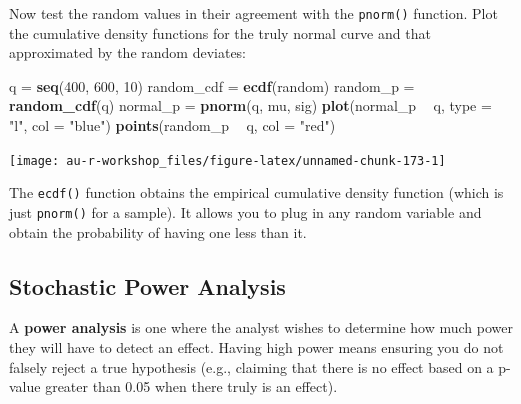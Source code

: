 \documentclass[]{book}
\newenvironment{Shaded}{\begin{snugshade}}{\end{snugshade}}
\newcommand{\KeywordTok}[1]{\textcolor[rgb]{0.13,0.29,0.53}{\textbf{#1}}}
\newcommand{\DataTypeTok}[1]{\textcolor[rgb]{0.13,0.29,0.53}{#1}}
\newcommand{\DecValTok}[1]{\textcolor[rgb]{0.00,0.00,0.81}{#1}}
\newcommand{\StringTok}[1]{\textcolor[rgb]{0.31,0.60,0.02}{#1}}
\newcommand{\OperatorTok}[1]{\textcolor[rgb]{0.81,0.36,0.00}{\textbf{#1}}}
\newcommand{\NormalTok}[1]{#1}
\theoremstyle{definition}
\theoremstyle{definition}
\theoremstyle{definition}
\theoremstyle{remark}
\begin{document}
Now test the random values in their agreement with the \texttt{pnorm()}
function. Plot the cumulative density functions for the truly normal
curve and that approximated by the random deviates:

\begin{Shaded}
\begin{Highlighting}[]
\NormalTok{q =}\StringTok{ }\KeywordTok{seq}\NormalTok{(}\DecValTok{400}\NormalTok{, }\DecValTok{600}\NormalTok{, }\DecValTok{10}\NormalTok{)}
\NormalTok{random_cdf =}\StringTok{ }\KeywordTok{ecdf}\NormalTok{(random)}
\NormalTok{random_p =}\StringTok{ }\KeywordTok{random_cdf}\NormalTok{(q)}
\NormalTok{normal_p =}\StringTok{ }\KeywordTok{pnorm}\NormalTok{(q, mu, sig)}
\KeywordTok{plot}\NormalTok{(normal_p }\OperatorTok{~}\StringTok{ }\NormalTok{q, }\DataTypeTok{type =} \StringTok{"l"}\NormalTok{, }\DataTypeTok{col =} \StringTok{"blue"}\NormalTok{)}
\KeywordTok{points}\NormalTok{(random_p }\OperatorTok{~}\StringTok{ }\NormalTok{q, }\DataTypeTok{col =} \StringTok{"red"}\NormalTok{)}
\end{Highlighting}
\end{Shaded}

\begin{center}\texttt{[image: au-r-workshop\_files/figure-latex/unnamed-chunk-173-1]} \end{center}

The \texttt{ecdf()} function obtains the empirical cumulative density
function (which is just \texttt{pnorm()} for a sample). It allows you to
plug in any random variable and obtain the probability of having one
less than it.

\subsection{Stochastic Power Analysis}\label{power-ex}

A \textbf{power analysis} is one where the analyst wishes to determine
how much power they will have to detect an effect. Having high power
means ensuring you do not falsely reject a true hypothesis (e.g.,
claiming that there is no effect based on a p-value greater than 0.05
when there truly is an effect).
\end{document}
